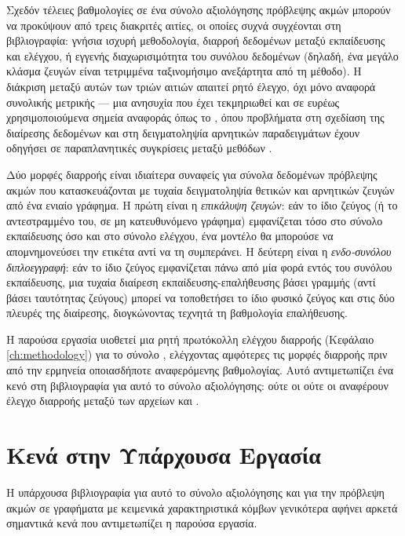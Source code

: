 Σχεδόν τέλειες βαθμολογίες σε ένα σύνολο αξιολόγησης πρόβλεψης ακμών μπορούν να
προκύψουν από τρεις διακριτές αιτίες, οι οποίες συχνά συγχέονται στη βιβλιογραφία:
γνήσια ισχυρή μεθοδολογία, διαρροή δεδομένων μεταξύ εκπαίδευσης και ελέγχου, ή
εγγενής διαχωρισιμότητα του συνόλου δεδομένων (δηλαδή, ένα μεγάλο κλάσμα ζευγών
είναι τετριμμένα ταξινομήσιμο ανεξάρτητα από τη μέθοδο).
Η διάκριση μεταξύ αυτών
των τριών αιτιών απαιτεί ρητό έλεγχο, όχι μόνο αναφορά συνολικής μετρικής — μια
ανησυχία που έχει τεκμηριωθεί και σε ευρέως χρησιμοποιούμενα σημεία αναφοράς όπως
το , όπου προβλήματα στη σχεδίαση της διαίρεσης δεδομένων και στη
δειγματοληψία αρνητικών παραδειγμάτων έχουν οδηγήσει σε παραπλανητικές συγκρίσεις
μεταξύ μεθόδων \cite{li2023evaluating}.

Δύο μορφές διαρροής είναι ιδιαίτερα συναφείς για σύνολα δεδομένων πρόβλεψης ακμών
που κατασκευάζονται με τυχαία δειγματοληψία θετικών και αρνητικών ζευγών από ένα
ενιαίο γράφημα.
Η πρώτη είναι η \textit{επικάλυψη ζευγών}: εάν το ίδιο ζεύγος (ή το
αντεστραμμένο του, σε μη κατευθυνόμενο γράφημα) εμφανίζεται τόσο στο σύνολο
εκπαίδευσης όσο και στο σύνολο ελέγχου, ένα μοντέλο θα μπορούσε να απομνημονεύσει
την ετικέτα αντί να τη συμπεράνει.
Η δεύτερη είναι η \textit{ενδο-συνόλου
διπλοεγγραφή}: εάν το ίδιο ζεύγος εμφανίζεται πάνω από μία φορά εντός του συνόλου
εκπαίδευσης, μια τυχαία διαίρεση εκπαίδευσης-επαλήθευσης βάσει γραμμής (αντί βάσει
ταυτότητας ζεύγους) μπορεί να τοποθετήσει το ίδιο φυσικό ζεύγος και στις δύο
πλευρές της διαίρεσης, διογκώνοντας τεχνητά τη βαθμολογία επαλήθευσης.

Η παρούσα εργασία υιοθετεί μια ρητή πρωτόκολλη ελέγχου διαρροής (Κεφάλαιο~
\ref{ch:methodology}) για το σύνολο , ελέγχοντας αμφότερες τις
μορφές διαρροής πριν από την ερμηνεία οποιασδήποτε αναφερόμενης βαθμολογίας.
Αυτό αντιμετωπίζει ένα κενό στη βιβλιογραφία για αυτό το σύνολο αξιολόγησης: ούτε
οι \textcite{phan2023link} ούτε οι \textcite{tran2023text} αναφέρουν
έλεγχο διαρροής μεταξύ των αρχείων \texttt{} και
\texttt{}.


\section{Κενά στην Υπάρχουσα Εργασία}
\label{sec:gaps}

Η υπάρχουσα βιβλιογραφία για αυτό το σύνολο αξιολόγησης και για την πρόβλεψη ακμών
σε γραφήματα με κειμενικά χαρακτηριστικά κόμβων γενικότερα αφήνει αρκετά σημαντικά
κενά που αντιμετωπίζει η παρούσα εργασία.

